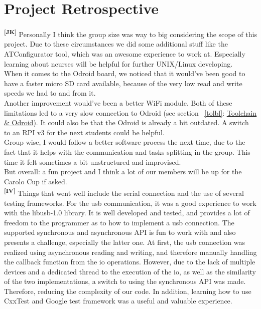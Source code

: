 \chapter{Project Retrospective}
\textsuperscript{\textbf{[JK]}}
Personally I think the group size was way to big considering the scope of this
project. Due to these circumstances we did some additional stuff like the
ATConfigurator tool, which was an awesome experience to work at. Especially
learning about ncurses will be helpful for further UNIX/Linux developing.\\
When it comes to the Odroid board, we noticed that it would’ve been good to have
a faster micro SD card available, because of the very low read and write speeds
we had to and from it.\\
Another improvement would’ve been a better WiFi module. Both of these
limitations led to a very slow connection to Odroid (see section ~\ref{tolbl}:
\hyperlink{totgt}{Toolchain \& Odroid}). It could also be that the Odroid is
already a bit outdated. A switch to an RPI v3 for the next students could be
helpful.\\
Group wise, I would follow a better software process the next time, due to the
fact that it helps with the communication and tasks splitting in the group. This
time it felt sometimes a bit unstructured and improvised.\\
But overall: a fun project and I think a lot of our members will be up for the
Carolo Cup if asked.\\

\noindent
\textsuperscript{\textbf{[IV]}}
Things that went well include the serial connection and the use of several
testing frameworks. For the usb communication, it was a good experience to work
with the libusb-1.0 library. It is well developed and tested, and provides a lot
of freedom to the programmer as to how to implement a usb connection. The
supported synchronous and asynchronous API is fun to work with and also presents
a challenge, especially the latter one. At first, the usb connection was
realized using asynchronous reading and writing, and therefore manually handling
the callback function from the io operations. However, due to the lack of
multiple devices and a dedicated thread to the execution of the io, as well as
the similarity of the two implementations, a switch to using the synchronous API
was made. Therefore, reducing the complexity of our code. In addition, learning
how to use CxxTest and Google test framework was a useful and valuable
experience.\\

